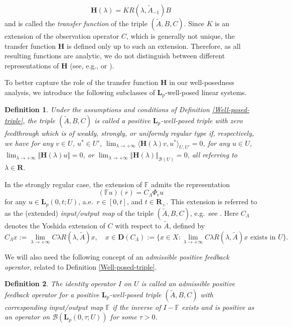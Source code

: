 \documentclass[a4paper,11pt,reqno]{amsart}
\def\la{\lambda}
\def\t{\tau}
\def\calB{{\calB}}
\def\calB{{\mathcal{B}}}
\def\R{\mathbf{R}}
\def\F{\mathbb F}
\theoremstyle{plain}
\newtheorem{definition}{Definition}[section]
\numberwithin{equation}{section}
\begin{document}
\begin{equation}\label{transfer.fct}
\mathbf{H}(\lambda) = K R(\lambda,\tilde{A}_{-1}) B
\end{equation}
and is called the \textit{transfer function} of the triple $(\tilde{A},B,C)$. Since $K$ is an extension of the observation operator $C$, which is generally not unique, the transfer function $\mathbf{H}$ is defined only up to such an extension. Therefore, as all resulting functions are analytic, we do not distinguish between different representations of $\mathbf{H}$ (see, e.g., \cite[Section 4.6]{MR2154892} or \cite[Section 3]{StaffansWeiss2002}).

To better capture the role of the transfer function $\mathbf{H}$ in our well-posedness analysis, we introduce the following subclasses of $\bm{L}_p$-well-posed linear systems.
\begin{definition}\label{regularity}
Under the assumptions and conditions of Definition \ref{Well-posed-triple}, the triple $(\tilde{{A}},{B},{C})$ is called a positive $\bm{L}_p$-well-posed triple with zero feedthrough which is of weakly, strongly, or uniformly regular type if, respectively, we have for any $v\in {U}$, $u^*\in {U}'$, $\lim_{\la\to +\infty }\langle\mathbf{H}(\la)v,u^*\rangle_{U,U'}=0$, for any $u\in {U}$, $\lim_{\la\to +\infty }\Vert \mathbf{H}(\la)u\Vert=0$, or $\lim_{\la\to +\infty }\Vert\mathbf{H}(\la)\Vert_{\calB({U})}=0$, all referring to $\la\in\R$.
\end{definition}

In the strongly regular case, the extension of $\F$ admits the representation
\begin{equation*}
(\F u)(r)=C_\Lambda \Phi_r u
\end{equation*}
for any $u\in \bm{L}_{p}(0,t;{U})$, a.e.\ $r\in [0,t]$, and $t\in \R_+$. This extension is referred to as the (extended) \textit{input/output map} of the triple $(\tilde{A},B,C)$, e.g.\ see \cite[Section 3.3]{GANTOUH2026106307}. Here $C_\Lambda $ denotes the Yoshida extension of $C$ with respect to $\tilde{A}$, defined by
\begin{equation*}
C_\Lambda x := \lim_{\la \to +\infty}C\la R(\la,\tilde{A})x,\quad x\in \bm{D}(C_\Lambda):= \{x\in X: \text{$\lim_{\la \to +\infty}C\la R(\la,\tilde{A})x$ exists in $U$}\}.
\end{equation*}

We will also need the following concept of an \textit{admissible positive feedback operator}, related to Definition \ref{Well-posed-triple}.
\begin{definition}\label{Definition-admissible}
The identity operator $I$ on $U$ is called an admissible positive feedback operator for a positive $\bm{L}_p$-well-posed triple $(\tilde{{A}},{B},{C})$ with corresponding input/output map $\F$ if the inverse of $I-\F$ exists and is positive as an operator on $\calB(\bm{L}_p(0,\t;{U}))$ for some $\t>0$.
\end{definition}
\end{document}
